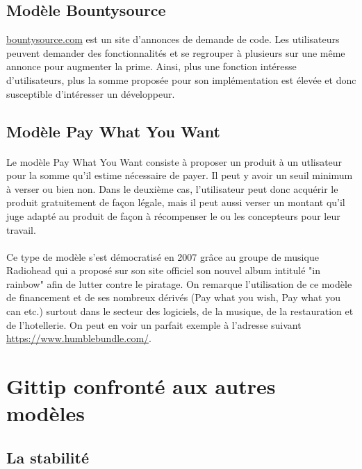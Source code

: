     \subsection{Modèle Bountysource}

\url{bountysource.com} est un site d'annonces de demande de code. Les
utilisateurs peuvent demander des fonctionnalités et se regrouper à plusieurs
sur une même annonce pour augmenter la prime. Ainsi, plus une fonction
intéresse d'utilisateurs, plus la somme proposée pour son implémentation est
élevée et donc susceptible d'intéresser un développeur.

    \subsection{Modèle Pay What You Want}
    
    \paragraph{} Le modèle Pay What You Want consiste à proposer un produit à
    un utlisateur pour la somme qu'il estime nécessaire de payer. Il peut y
    avoir un seuil minimum à verser ou bien non. Dans le deuxième cas,
    l'utilisateur peut donc acquérir le produit gratuitement de façon légale,
    mais il peut aussi verser un montant qu'il juge adapté au produit de façon
    à récompenser le ou les concepteurs pour leur travail.

    \paragraph{} Ce type de modèle s'est démocratisé en 2007 grâce au groupe de
    musique Radiohead qui a proposé sur son site officiel son nouvel album
    intitulé "in rainbow" afin de lutter contre le piratage. On remarque
    l'utilisation de ce modèle de financement et de ses nombreux dérivés (Pay
    what you wish, Pay what you can etc.) surtout dans le secteur des
    logiciels, de la musique, de la restauration et de l'hotellerie. On peut en
    voir un parfait exemple à l'adresse suivant
    \url{https://www.humblebundle.com/}.


\section{Gittip confronté aux autres modèles}

\subsection{La stabilité}



